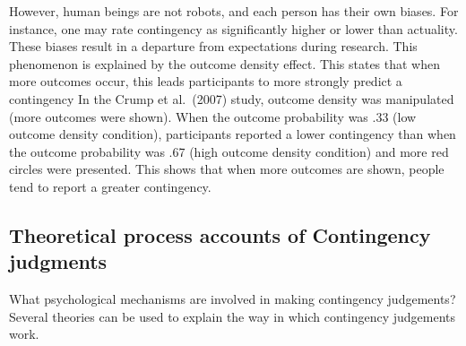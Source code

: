 \documentclass[
  english,
  man,floatsintext]{apa6}
\begin{document}
However, human beings are not robots, and each person has their own biases. For instance, one may rate contingency as significantly higher or lower than actuality. These biases result in a departure from expectations during research. This phenomenon is explained by the outcome density effect. This states that when more outcomes occur, this leads participants to more strongly predict a contingency In the Crump et al.~(2007) study, outcome density was manipulated (more outcomes were shown). When the outcome probability was .33 (low outcome density condition), participants reported a lower contingency than when the outcome probability was .67 (high outcome density condition) and more red circles were presented. This shows that when more outcomes are shown, people tend to report a greater contingency.

\hypertarget{theoretical-process-accounts-of-contingency-judgments}{%
\subsection{Theoretical process accounts of Contingency judgments}\label{theoretical-process-accounts-of-contingency-judgments}}

What psychological mechanisms are involved in making contingency judgements? Several theories can be used to explain the way in which contingency judgements work.
\end{document}
